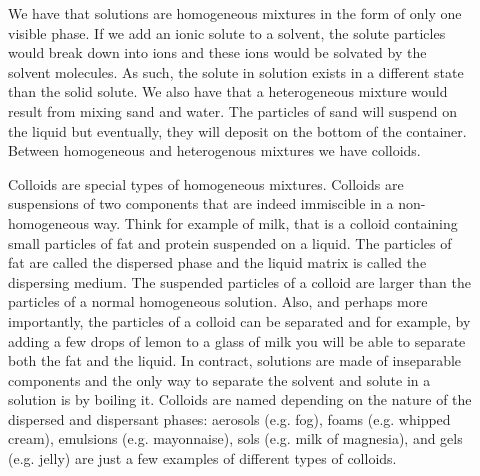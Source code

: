 \documentclass[main.tex]{subfiles}
\begin{document}
\begin{description}
\item[] 
We have that solutions are homogeneous mixtures in the form of only one visible phase. If we add an ionic solute to a solvent, the solute particles would break down into ions and these ions would be solvated by the solvent molecules. As such,  the solute in solution exists in a different state than the solid solute. We also have that a heterogeneous mixture would result from mixing sand and water. The particles of sand will suspend on the liquid but eventually, they will deposit on the bottom of the container. Between homogeneous and heterogenous mixtures we have colloids.

Colloids are special types of homogeneous mixtures. Colloids are suspensions of two components that are indeed immiscible in a non-homogeneous way. Think for example of milk, that is a colloid containing small particles of fat and protein suspended on a liquid. The particles of fat are called the dispersed phase and the liquid matrix is called the dispersing medium. The suspended particles of a colloid are larger than the particles of a normal homogeneous solution. Also, and perhaps more importantly, the particles of a colloid can be separated and for example, by adding a few drops of lemon to a glass of milk you will be able to separate both the fat and the liquid. In contract, solutions are made of inseparable components and the only way to separate the solvent and solute in a solution is by boiling it. Colloids are named depending on the nature of the dispersed and dispersant phases: aerosols (e.g. fog), foams (e.g. whipped cream), emulsions (e.g. mayonnaise), sols (e.g. milk of magnesia), and gels (e.g. jelly) are just a few examples of different types of colloids.


\end{description}
\end{document}
